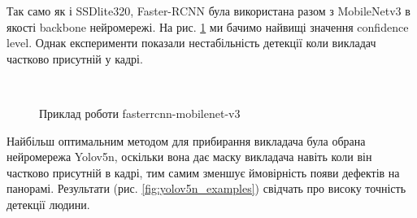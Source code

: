 Так само як і SSDlite320, Faster-RCNN була використана разом з MobileNetv3 в якості backbone нейромережі.
На рис. \ref{fig:fasterrcnn_examples} ми бачимо найвищі значення confidence level. Однак експерименти
показали нестабільність детекції коли викладач частково присутній у кадрі.

\begin{figure}[H]
    \centering
    \\
    \caption{Приклад роботи fasterrcnn-mobilenet-v3
        \label{fig:fasterrcnn_examples}
    }
\end{figure}

Найбільш оптимальним методом для прибирання викладача була обрана нейромережа Yolov5n, оскільки вона
дає маску викладача навіть коли він частково присутній в кадрі, тим самим зменшує ймовірність появи
дефектів на панорамі. Результати (рис. \ref{fig:yolov5n_examples}) свідчать про високу точність детекції
людини.

